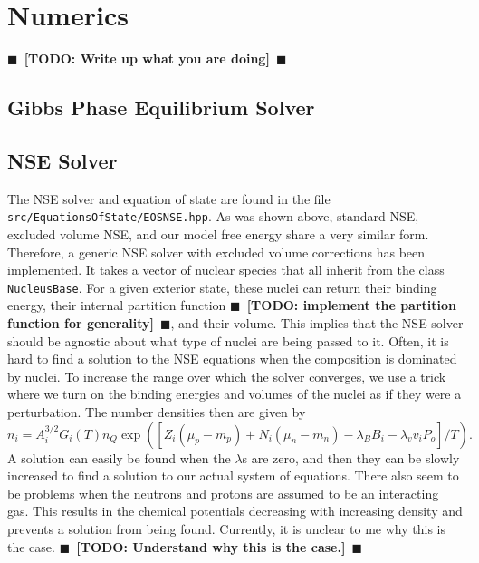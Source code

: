 \documentclass[11pt,letter]{article}
\newcommand{\todo}[1]{{$\blacksquare$~\textbf{\color{blue}[TODO: #1]}}~$\blacksquare$}
\begin{document}
\section{Numerics}
\todo{Write up what you are doing} 
\subsection{Gibbs Phase Equilibrium Solver}
\subsection{NSE Solver}
The NSE solver and equation of state are found in the file \texttt{src/EquationsOfState/EOSNSE.hpp}.  As was shown above, standard NSE, excluded volume NSE, and our model free energy share a very similar form.  Therefore, a generic NSE solver with excluded volume corrections has been implemented.  It takes a vector of nuclear species that all inherit from the class \texttt{NucleusBase}.  For a given exterior state, these nuclei can return their binding energy, their internal partition function \todo{implement the partition function for generality}, and their volume.  This implies that the NSE solver should be agnostic about what type of nuclei are being passed to it.  Often, it is hard to find a solution to the NSE equations when the composition is dominated by nuclei.  To increase the range over which the solver converges, we use a trick where we turn on the binding energies and volumes of the nuclei as if they were a perturbation.  The number densities then are given by 
\begin{equation}
n_{i} = A_i^{3/2} G_i(T) n_Q \exp\left(\left[Z_i (\mu_p - m_p) + N_i (\mu_n - m_n) 
- \lambda_B B_i - \lambda_v v_i P_o \right]/T\right).
\end{equation}
A solution can easily be found when the $\lambda$s are zero, and then they can be slowly increased to find a solution to our actual system of equations.   There also seem to be problems when the neutrons and protons are assumed to be an interacting gas.  This results in the chemical potentials decreasing with increasing density and prevents a solution from being found.  Currently, it is unclear to me why this is the case. \todo{Understand why this is the case.}
\end{document}
